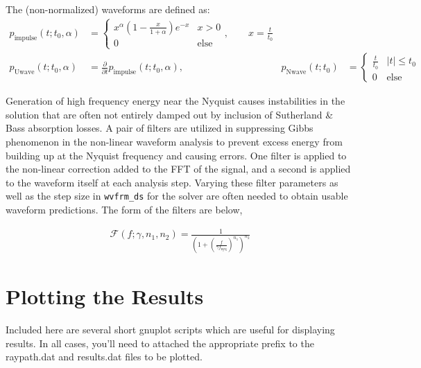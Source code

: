 \documentclass[10pt]{article}
\begin{document}
\noindent The (non-normalized) waveforms are defined as:
\begin{align*}
 p_\text{impulse} \left( t; t_0, \alpha \right) & = \left\{ 
 \begin{matrix}
 x^\alpha \left( 1 - \frac{x}{1 + \alpha} \right) e^{-x}  & x > 0 \\
 0 & \text{else} 
 \end{matrix}
 \right., \quad \quad x = \frac{t}{t_0} \\
 p_\text{Uwave} \left( t; t_0, \alpha \right) & = \frac{\partial}{\partial t} p_\text{impulse} \left( t; t_0, \alpha \right), \quad \quad & 
 p_\text{Nwave} \left( t; t_0 \right)  & = \left\{ 
 \begin{matrix}
 \frac{t}{t_0}  	& | t |  \leq t_0 \\
 0 			& \text{else} 
 \end{matrix}
 \right.
 \end{align*}

Generation of high frequency energy near the Nyquist causes instabilities in the solution that are often not entirely damped out by inclusion of Sutherland \& Bass absorption losses.  A pair of filters are utilized in suppressing Gibbs phenomenon in the non-linear waveform analysis to prevent excess energy from building up at the Nyquist frequency and causing errors.  One filter is applied to the non-linear correction added to the FFT of the signal, and a second is applied to the waveform itself at each analysis step.  Varying these filter parameters as well as the step size in \verb=wvfrm_ds= for the solver are often needed to obtain usable waveform predictions.  The form of the filters are below,

\begin{align*}
 \mathcal{F} \left( f; \gamma, n_1, n_2  \right) = \frac{1}{\left( 1 + \left( \frac{f}{\gamma f_\text{nyq}} \right)^{n_1} \right)^{n_2}}
\end{align*}

\newpage
\section{Plotting the Results}
Included here are several short gnuplot scripts which are useful for displaying results.  In all cases, you'll need to attached the appropriate prefix to the raypath.dat and results.dat files to be plotted. \newline
\end{document}
